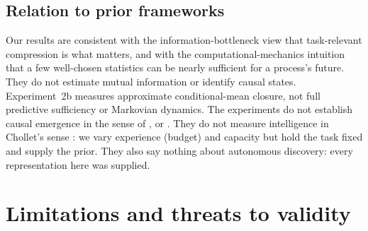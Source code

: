 \documentclass[11pt,a4paper]{article}
\begin{document}
\subsection{Relation to prior frameworks}
Our results are consistent with the information-bottleneck view that
task-relevant compression is what matters, and with the computational-mechanics
intuition that a few well-chosen statistics can be nearly sufficient for a
process's future. They do not estimate mutual information or identify causal states.
Experiment~2b measures approximate conditional-mean closure, not full
predictive sufficiency or Markovian dynamics. The experiments do not establish
causal emergence in
the sense of \citet{hoel2013}, \citet{hoel2017} or \citet{rosas2020}. They do not measure intelligence in
Chollet's sense \citep{chollet2019}: we vary experience (budget) and capacity
but hold the task fixed and supply the prior. They also say nothing about
autonomous discovery: every representation here was supplied.

\section{Limitations and threats to validity}
\end{document}
